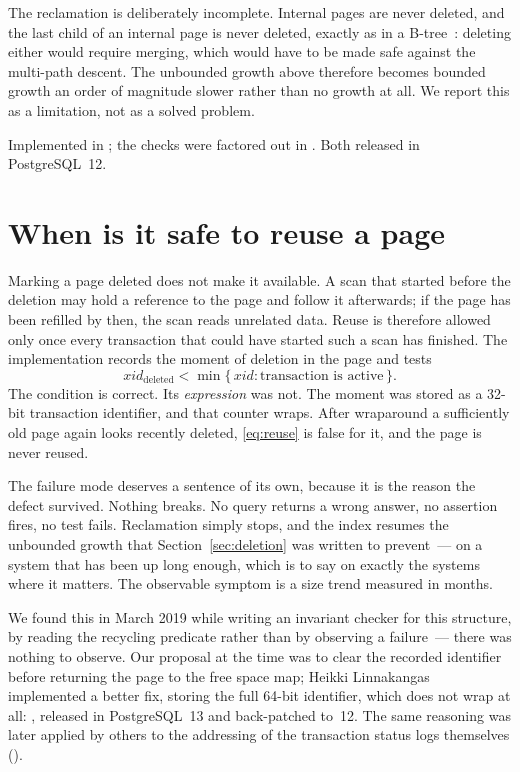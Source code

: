 The reclamation is deliberately incomplete. Internal pages are never deleted,
and the last child of an internal page is never deleted, exactly as in a
B-tree~\cite{graefe2011modern}: deleting either would require merging, which
would have to be made safe against the multi-path descent. The unbounded growth
above therefore becomes bounded growth an order of magnitude slower rather than
no growth at all. We report this as a limitation, not as a solved problem.

Implemented in ; the checks were factored out in
. Both released in PostgreSQL~12.

\section{When is it safe to reuse a page}
\label{sec:xid}

Marking a page deleted does not make it available. A scan that started before
the deletion may hold a reference to the page and follow it afterwards; if the
page has been refilled by then, the scan reads unrelated data. Reuse is
therefore allowed only once every transaction that could have started such a
scan has finished. The implementation records the moment of deletion in the page
and tests
%
\begin{equation}\label{eq:reuse}
  \mathit{xid}_{\mathrm{deleted}} < \min \{\, \mathit{xid} : \text{transaction is active} \,\} .
\end{equation}
%
The condition is correct. Its \emph{expression} was not. The moment was stored
as a 32-bit transaction identifier, and that counter wraps. After wraparound a
sufficiently old page again looks recently deleted, \eqref{eq:reuse} is false
for it, and the page is never reused.

The failure mode deserves a sentence of its own, because it is the reason the
defect survived. Nothing breaks. No query returns a wrong answer, no assertion
fires, no test fails. Reclamation simply stops, and the index resumes the
unbounded growth that Section~\ref{sec:deletion} was written to prevent~--- on a
system that has been up long enough, which is to say on exactly the systems
where it matters. The observable symptom is a size trend measured in months.

We found this in March 2019 while writing an invariant checker for this
structure, by reading the recycling predicate rather than by observing a
failure~--- there was nothing to observe. Our proposal at the time was to clear
the recorded identifier before returning the page to the free space map; Heikki
Linnakangas implemented a better fix, storing the full 64-bit identifier, which
does not wrap at all: , released in PostgreSQL~13 and
back-patched to~12. The same reasoning was later applied by others to the
addressing of the transaction status logs themselves ().

